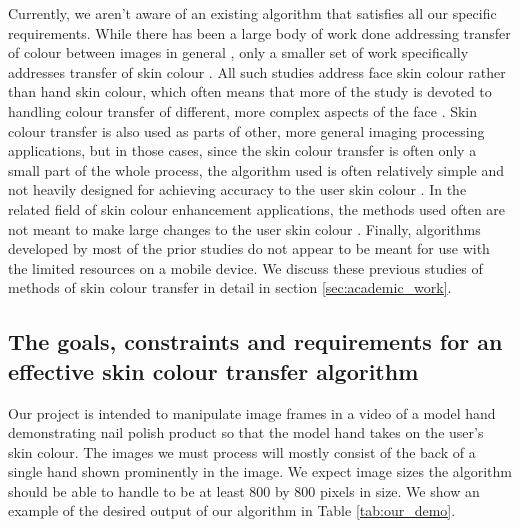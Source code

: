 Currently, we aren't aware of an existing algorithm that satisfies all our specific requirements. While there has been a large body of work done addressing transfer of colour between images in general \cite{reinhard_2001_transfer, pitie_2005_pdf, chen_2014_propagation, chang_2015_palette, zhang_2017_decomposition}, only a smaller set of work specifically addresses transfer of skin colour \cite{yin_2004_transfer, seo_2005_transfer, yang_2017_semantic}. All such studies address face skin colour rather than hand skin colour, which often means that more of the study is devoted to handling colour transfer of different, more complex aspects of the face \cite{yang_2017_semantic}. Skin colour transfer is also used as parts of other, more general imaging processing applications, but in those cases, since the skin colour transfer is often only a small part of the whole process, the algorithm used is often relatively simple and not heavily designed for achieving accuracy to the user skin colour \cite{shilkrot_2013_garment, li_2015_replace}. In the related field of skin colour enhancement applications, the methods used often are not meant to make large changes to the user skin colour \cite{aradhye_2009_enhancement, lee_2010_mobile}. Finally, algorithms developed by most of the prior studies do not appear to be meant for use with the limited resources on a mobile device. We discuss these previous studies of methods of skin colour transfer in detail in section \ref{sec:academic_work}.



\subsection{The goals, constraints and requirements for an effective skin colour transfer algorithm}
Our project is intended to manipulate image frames in a video of a model hand demonstrating nail polish product so that the model hand takes on the user's skin colour. The images we must process will mostly consist of the back of a single hand shown prominently in the image. We expect image sizes the algorithm should be able to handle to be at least 800 by 800 pixels in size. We show an example of the desired output of our algorithm in Table \ref{tab:our_demo}.

